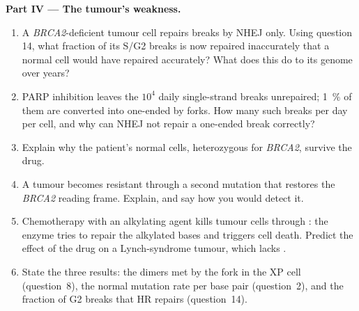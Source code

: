 \begin{problem}
\medskip
\noindent\textbf{Part IV --- The tumour's weakness.}
\begin{enumerate}[resume]
  \item A \emph{BRCA2}-deficient tumour cell repairs breaks by NHEJ only.
        Using question 14, what fraction of its S/G2 breaks is now
        repaired inaccurately that a normal cell would have repaired
        accurately? What does this do to its genome over years?
  \item PARP inhibition leaves the $10^{4}$ daily single-strand breaks
        unrepaired; \qty{1}{\%} of them are converted into one-ended
         by forks. How many such breaks per day
        per cell, and why can NHEJ not repair a one-ended break
        correctly?
  \item Explain why the patient's normal cells, heterozygous for
        \emph{BRCA2}, survive the drug.
  \item A tumour becomes resistant through a second mutation that
        restores the \emph{BRCA2} reading frame. Explain, and say how
        you would detect it.
  \item Chemotherapy with an alkylating agent kills tumour cells
        through : the enzyme tries to repair the
        alkylated bases and triggers cell death. Predict the effect of
        the drug on a Lynch-syndrome tumour, which lacks .
  \item State the three results: the dimers met by the fork in the XP
        cell (question~8), the normal mutation rate per base pair
        (question~2), and the fraction of G2 breaks that HR repairs
        (question~14).
\end{enumerate}
\end{problem}
